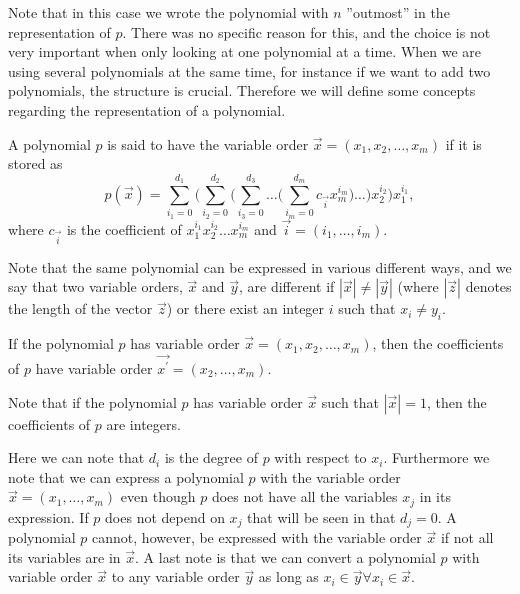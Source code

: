 Note that in this case we wrote the polynomial with $n$ ''outmost'' in the representation of $p$. There was no specific reason for this, and the choice is not very important when only looking at one polynomial at a time. When we are using several polynomials at the same time, for instance if we want to add two polynomials, the structure is crucial. Therefore we will define some concepts regarding the representation of a polynomial.

\begin{definition}
  A polynomial $p$ is said to have the variable order $\vec{x}=(x_1,x_2,\ldots,x_m)$ if it is stored as
  \begin{equation}
    p(\vec{x}) = \sum_{i_1=0}^{d_1}\Bigg(\sum_{i_2=0}^{d_2}\Big(\sum_{i_3=0}^{d_3}\ldots\big(\sum_{i_m=0}^{d_m} c_\vec{i}x_m^{i_m}\big)\ldots\Big)x_2^{i_2}\Bigg)x_1^{i_1},
  \end{equation}
  where $c_\vec{i}$ is the coefficient of $x_1^{i_1}x_2^{i_2}\ldots x_m^{i_m}$ and $\vec{i}=(i_1,\ldots,i_m)$.

  Note that the same polynomial can be expressed in various different ways, and we say that two variable orders, $\vec{x}$ and $\vec{y}$, are different if $|\vec{x}|\neq|\vec{y}|$ (where $|\vec{z}|$ denotes the length of the vector $\vec{z}$) or there exist an integer $i$ such that $x_i\neq y_i$.
\end{definition}
\begin{remark}
  If the polynomial $p$ has variable order $\vec{x}=(x_1,x_2,\ldots,x_m)$, then the coefficients of $p$ have variable order $\vec{x^\prime}=(x_2,\ldots,x_m)$.
\end{remark}
\begin{remark}
  Note that if the polynomial $p$ has variable order $\vec{x}$ such that $|\vec{x}|=1$, then the coefficients of $p$ are integers.
\end{remark}

Here we can note that $d_i$ is the degree of $p$ with respect to $x_i$. Furthermore we note that we can express a polynomial $p$ with the variable order $\vec{x}=(x_1,\ldots,x_m)$ even though $p$ does not have all the variables $x_j$ in its expression. If $p$ does not depend on $x_j$ that will be seen in that $d_j=0$. A polynomial $p$ cannot, however, be expressed with the variable order $\vec{x}$ if not all its variables are in $\vec{x}$. A last note is that we can convert a polynomial $p$ with variable order $\vec{x}$ to any variable order $\vec{y}$ as long as $x_i\in\vec{y} \forall x_i\in\vec{x}$.

